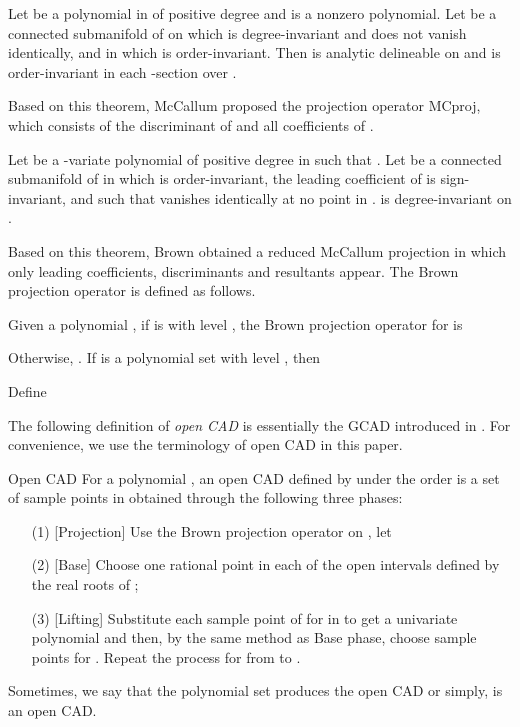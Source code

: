 \documentclass[amsthm]{elsart}
\def \MCproj  {{\rm MCproj}}
\begin{document}
\begin{thm}\label{thm:McCallum}\citep{McCallum1,McCallum2}
        Let  be a polynomial in  of positive degree and  is a nonzero polynomial. Let  be a connected submanifold of  on which  is degree-invariant and does not vanish identically, and in which  is order-invariant. Then  is analytic delineable on  and is order-invariant in each -section over .
\end{thm}
Based on this theorem, McCallum proposed the projection operator \MCproj, which consists of the discriminant of  and all coefficients of .

\begin{thm}\label{thm:Brown}\citep{Brown01a}
        Let  be a -variate polynomial of positive degree in  such that  . Let  be a connected submanifold of  in which  is order-invariant, the leading coefficient of  is sign-invariant, and such that  vanishes identically at no point in .  is degree-invariant on .
\end{thm}
Based on this theorem, Brown obtained a reduced McCallum projection in which only leading coefficients, discriminants and resultants appear. The Brown projection operator is defined as follows.
\begin{defn} \label{def:brown projection}\citep{Brown01a}
        Given a polynomial , if  is with level ,
        the Brown projection operator for  is
        
        Otherwise, .
        If  is a polynomial set with level , then
        
        Define
        
\end{defn}

The following definition of {\em open CAD\/}  is essentially the GCAD introduced in \cite{Strzebonski}. For convenience, we use the terminology of open CAD in this paper.

\begin{defn} Open CAD \label{def:opencad}
        For a polynomial , an open CAD defined by  under the order  is a set of sample points in  obtained through the following three phases:
\begin{enumerate}
       \item[(1)] [Projection] Use the Brown projection operator on ,
                  let  \item[(2)] [Base] Choose one rational point in each of the open intervals defined by the real roots of ; \item[(3)] [Lifting] Substitute each sample point of  for  in  to get a univariate polynomial  and then, by the same method as Base phase, choose sample points for . Repeat the process for  from  to .
\end{enumerate}
\medskip
Sometimes, we say that the polynomial set  produces the open CAD or simply,  is an open CAD.
\end{defn}
\end{document}
